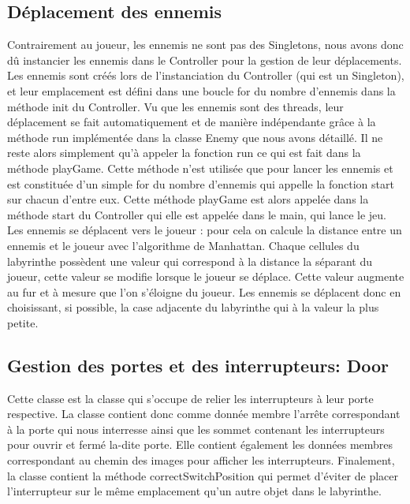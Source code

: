 \documentclass [10pt, a4paper]{article}
\begin{document}
\subsection {Déplacement des ennemis}
Contrairement au joueur, les ennemis ne sont pas des Singletons, nous avons donc dû instancier les ennemis dans le Controller pour la gestion de leur déplacements. Les ennemis sont créés lors de l'instanciation du Controller (qui est un Singleton), et leur emplacement est défini dans une boucle for du nombre d'ennemis dans la méthode init du Controller. Vu que les ennemis sont des threads, leur déplacement se fait automatiquement et de manière indépendante grâce à la méthode run implémentée dans la classe Enemy que nous avons détaillé. Il ne reste alors simplement qu'à appeler la fonction run ce qui est fait dans la méthode playGame. Cette méthode n'est utilisée que pour lancer les ennemis et est constituée d'un simple for du nombre d'ennemis qui appelle la fonction start sur chacun d'entre eux. Cette méthode playGame est alors appelée dans la méthode start du Controller qui elle est appelée dans le main, qui lance le jeu. 
Les ennemis se déplacent vers le joueur : pour cela on calcule la distance entre un ennemis et le joueur avec l'algorithme de Manhattan. Chaque cellules du labyrinthe possèdent une valeur qui correspond à la distance la séparant du joueur, cette valeur se modifie lorsque le joueur se déplace. Cette valeur augmente au fur et à mesure que l'on s'éloigne du joueur. Les ennemis se déplacent donc en choisissant, si possible, la case adjacente du labyrinthe qui à la valeur la plus petite.




\subsection {Gestion des portes et des interrupteurs: Door}
Cette classe est la classe qui s'occupe de relier les interrupteurs à leur porte respective. La classe contient donc comme donnée membre l'arrête correspondant à la porte qui nous interresse ainsi que les sommet contenant les interrupteurs pour ouvrir et fermé la-dite porte. Elle contient également les données membres correspondant au chemin des images pour afficher les interrupteurs. Finalement, la classe contient la méthode correctSwitchPosition qui permet d'éviter de placer l'interrupteur sur le même emplacement qu'un autre objet dans le labyrinthe.
\end{document}
